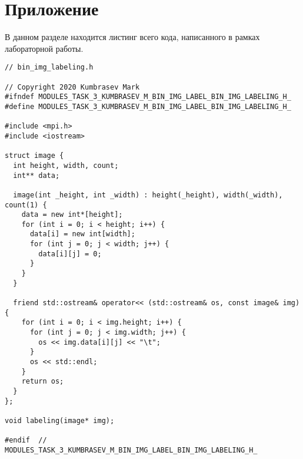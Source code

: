 \documentclass{report}
\begin{document}
\section*{Приложение}
В данном разделе находится листинг всего кода, написанного в рамках лабораторной работы.
\begin{lstlisting}
// bin_img_labeling.h

// Copyright 2020 Kumbrasev Mark
#ifndef MODULES_TASK_3_KUMBRASEV_M_BIN_IMG_LABEL_BIN_IMG_LABELING_H_
#define MODULES_TASK_3_KUMBRASEV_M_BIN_IMG_LABEL_BIN_IMG_LABELING_H_

#include <mpi.h>
#include <iostream>

struct image {
  int height, width, count;
  int** data;

  image(int _height, int _width) : height(_height), width(_width), count(1) {
    data = new int*[height];
    for (int i = 0; i < height; i++) {
      data[i] = new int[width];
      for (int j = 0; j < width; j++) {
        data[i][j] = 0;
      }
    }
  }

  friend std::ostream& operator<< (std::ostream& os, const image& img) {
    for (int i = 0; i < img.height; i++) {
      for (int j = 0; j < img.width; j++) {
        os << img.data[i][j] << "\t";
      }
      os << std::endl;
    }
    return os;
  }
};

void labeling(image* img);

#endif  // MODULES_TASK_3_KUMBRASEV_M_BIN_IMG_LABEL_BIN_IMG_LABELING_H_

\end{lstlisting}
\end{document}
